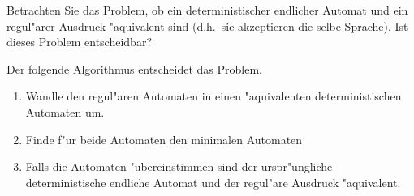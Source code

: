 Betrachten Sie das Problem, ob ein deterministischer endlicher Automat
und ein regul"arer Ausdruck "aquivalent sind (d.h.~sie akzeptieren die
selbe Sprache). Ist dieses Problem entscheidbar?

\begin{loesung}
Der folgende Algorithmus entscheidet das Problem.
\begin{enumerate}
\item Wandle den regul"aren Automaten in einen "aquivalenten deterministischen
Automaten um.
\item Finde f"ur beide Automaten den minimalen Automaten
\item Falls die Automaten "ubereinstimmen sind der urspr"ungliche
deterministische endliche Automat und der regul"are Ausdruck
"aquivalent.
\end{enumerate}
\end{loesung}
